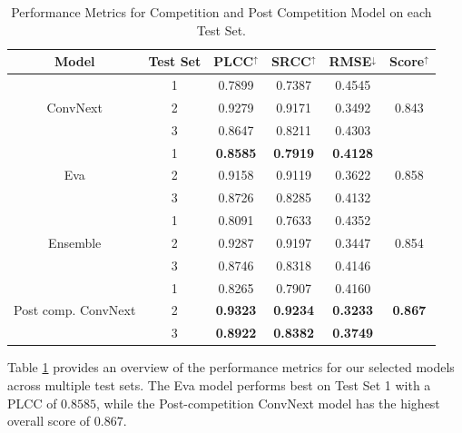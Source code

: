 \documentclass[a4paper,12pt,openright]{book}
\begin{document}
\begin{table}[h]

\smallskip
\begin{center}
\begin{tabular}{ | c | c | c | c | c | c | }
\hline  
  \textbf{Model} & \textbf{Test Set} & \textbf{PLCC$^{\uparrow}$} & \textbf{SRCC$^{\uparrow}$} & \textbf{RMSE$^{\downarrow}$} &
  \textbf{Score$^{\uparrow}$}\\ 
\hline  
  \multirow{3}{*}{ConvNext} & 1 & 0.7899 & 0.7387 & 0.4545 & \multirow{3}{*}{0.843} \\
                            & 2 & 0.9279 & 0.9171 & 0.3492 & \\
                            & 3 & 0.8647 & 0.8211 & 0.4303 & \\
\hline
  \multirow{3}{*}{Eva} & 1 & \textbf{0.8585} & \textbf{0.7919} & \textbf{0.4128} & \multirow{3}{*}{0.858}
  \\ & 2 & 0.9158 & 0.9119 & 0.3622 & \\
   & 3 & 0.8726 & 0.8285 & 0.4132 & \\
\hline

  \multirow{3}{*}{Ensemble} & 1 & 0.8091 & 0.7633 & 0.4352 & \multirow{3}{*}{0.854} \\
                            & 2 & 0.9287 &
                            0.9197 & 0.3447  & \\
                            & 3 & 0.8746 & 0.8318& 0.4146 & \\
                            \hline
  \multirow{3}{*}{Post comp. ConvNext} & 1 & 0.8265 & 0.7907 & 0.4160 & \multirow{3}{*}{\textbf{0.867}} \\
                            & 2 & \textbf{0.9323} & \textbf{ 0.9234} & \textbf{0.3233}  & \\
                            & 3 & \textbf{ 0.8922} & \textbf{0.8382} & \textbf{0.3749} & \\
\hline  
\end{tabular}
\end{center}
\caption{Performance Metrics for Competition and Post Competition Model on each Test Set.}
\label{res_test}
\end{table}

Table \ref{res_test} provides an overview of the performance metrics for our selected models across multiple test sets. The Eva model performs best on Test Set 1 with a PLCC of \(0.8585\), while the Post-competition ConvNext model has the highest overall score of \(0.867\).
\end{document}
